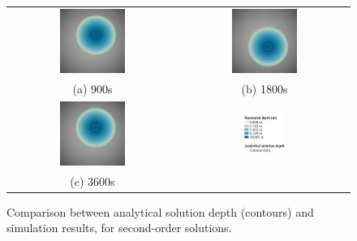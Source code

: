 \begin{figure}[tpb]
	\centering
	\begin{tabular}{cc}
		\includegraphics[width=0.4\textwidth]{numerical-test-figures/parabolic-bowl-2O-depth-900s.png} &
		\includegraphics[width=0.4\textwidth]{numerical-test-figures/parabolic-bowl-2O-depth-1800s.png} \\
		(a) 900s &
		(b) 1800s \\[6pt]
		\includegraphics[width=0.4\textwidth]{numerical-test-figures/parabolic-bowl-2O-depth-3600s.png} &
		\includegraphics[width=0.26\textwidth]{numerical-test-figures/parabolic-bowl-depth-legend.png} \\
		(c) 3600s &
	\end{tabular}
	\caption{Comparison between analytical solution depth (contours) and simulation results, for second-order solutions.}
	\label{TestResult_ParabolicBowl_2O}
\end{figure}

